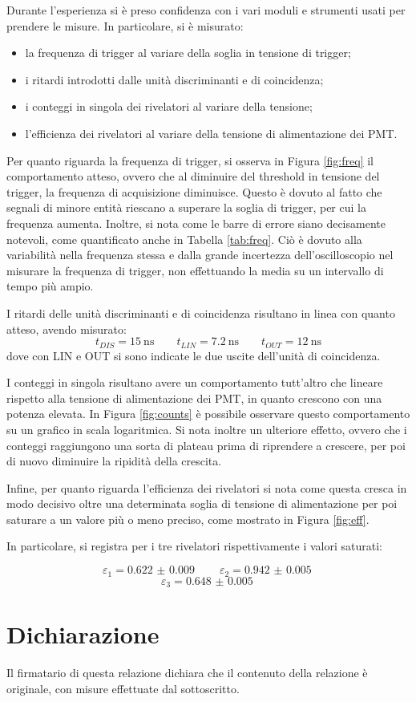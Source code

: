 \documentclass[10pt,a4paper]{article}
\begin{document}
Durante l'esperienza si è preso confidenza con i vari moduli e strumenti usati per prendere le misure. In particolare, si è misurato:
\begin{itemize}
    \item la frequenza di trigger al variare della soglia in tensione di trigger;
    \item i ritardi introdotti dalle unità discriminanti e di coincidenza;
    \item i conteggi in singola dei rivelatori al variare della tensione;
    \item l'efficienza dei rivelatori al variare della tensione di alimentazione dei PMT.
\end{itemize}

Per quanto riguarda la frequenza di trigger, si osserva in Figura \ref{fig:freq} il comportamento atteso, ovvero che al diminuire del threshold in tensione del trigger, la frequenza di acquisizione diminuisce. Questo è dovuto al fatto che segnali di minore entità riescano a superare la soglia di trigger, per cui la frequenza aumenta. Inoltre, si nota come le barre di errore siano decisamente notevoli, come quantificato anche in Tabella \ref{tab:freq}. Ciò è dovuto alla variabilità nella frequenza stessa e dalla grande incertezza dell'oscilloscopio nel misurare la frequenza di trigger, non effettuando la media su un intervallo di tempo più ampio. 

I ritardi delle unità discriminanti e di coincidenza risultano in linea con quanto atteso, avendo misurato:
\[ t_{DIS}=\SI{15}{\nano\second} \qquad t_{LIN}=\SI{7.2}{\nano \second} \qquad t_{OUT}=\SI{12}{\nano\second} \]
dove con LIN e OUT si sono indicate le due uscite dell'unità di coincidenza. 

I conteggi in singola risultano avere un comportamento tutt'altro che lineare rispetto alla tensione di alimentazione dei PMT, in quanto crescono con una potenza elevata. In Figura \ref{fig:counts} è possibile osservare questo comportamento su un grafico in scala logaritmica. Si nota inoltre un ulteriore effetto, ovvero che i conteggi raggiungono una sorta di plateau prima di riprendere a crescere, per poi di nuovo diminuire la ripidità della crescita. 

Infine, per quanto riguarda l'efficienza dei rivelatori si nota come questa cresca in modo decisivo oltre una determinata soglia di tensione di alimentazione per poi saturare a un valore più o meno preciso, come mostrato in Figura \ref{fig:eff}. 

In particolare, si registra per i tre rivelatori rispettivamente i valori saturati:

\[ \varepsilon_1=\SI{0.622(9)}{} \qquad \varepsilon_2=\SI{0.942(5)}{} \] \[\varepsilon_3=\SI{0.648(5)}{} \]


\section*{Dichiarazione}
Il firmatario di questa relazione dichiara che il contenuto della relazione \`e originale, con misure effettuate dal sottoscritto.
\end{document}

